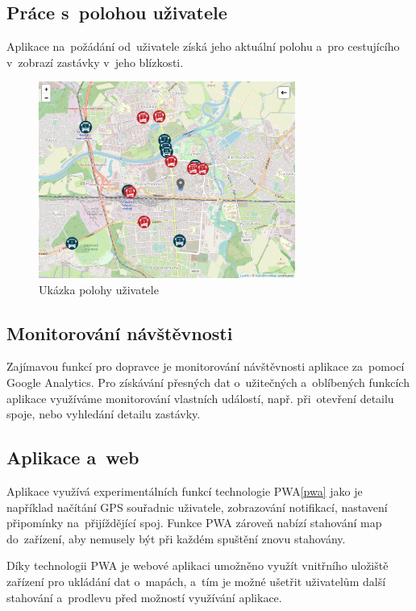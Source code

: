 \subsection{Práce s~polohou uživatele}
Aplikace na~požádání od~uživatele získá jeho aktuální polohu a~pro cestujícího v~zobrazí zastávky v~jeho blízkosti.

\begin{figure}[H]
    \centering
    \includegraphics[width=0.75\textwidth]{images/position.png}
    \caption{Ukázka polohy uživatele}
    \label{poloha}
\end{figure}
\subsection{Monitorování návštěvnosti}
Zajímavou funkcí pro dopravce je monitorování návštěvnosti aplikace za~pomocí Google Analytics. Pro získávání přesných dat o~užitečných a~oblíbených funkcích aplikace využíváme monitorování vlastních událostí, např. při~otevření detailu spoje, nebo vyhledání detailu zastávky.
\subsection{Aplikace a~web}
Aplikace využívá experimentálních funkcí technologie PWA\ref{pwa} jako je například načítání GPS souřadnic uživatele, zobrazování notifikací, nastavení připomínky na~přijíždějící spoj. Funkce PWA zároveň nabízí stahování map do~zařízení, aby nemusely být při každém spuštění znovu stahovány.

Díky technologii PWA je webové aplikaci umožněno využít vnitřního uložiště zařízení pro ukládání dat o~mapách, a~tím je možné ušetřit uživatelům další stahování a~prodlevu před možností využívání aplikace.
